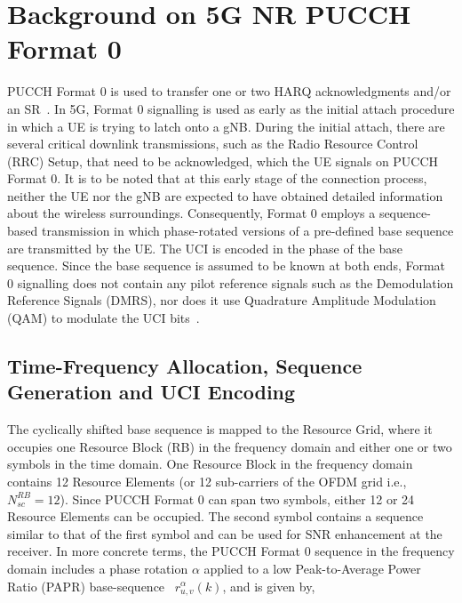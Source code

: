 \documentclass[journal]{IEEEtran}
\begin{document}
\section{Background on 5G NR PUCCH Format 0}
PUCCH Format 0 is used to transfer one or two HARQ acknowledgments and/or an SR~\cite{3gpp_38_213}. In 5G, Format 0 signalling is used as early as the initial attach procedure in which a UE is trying to latch onto a gNB. During the initial attach, there are several critical downlink transmissions, such as the Radio Resource Control (RRC) Setup, that need to be acknowledged, which the UE signals on PUCCH Format 0. It is to be noted that at this early stage of the connection process, neither the UE nor the gNB are expected to have obtained detailed information about the wireless surroundings. Consequently, Format 0 employs a sequence-based transmission in which phase-rotated versions of a pre-defined base sequence are transmitted by the UE. The UCI is encoded in the phase of the base sequence. Since the base sequence is assumed to be known at both ends, Format 0 signalling does not contain any pilot reference signals such as the Demodulation Reference Signals (DMRS), nor does it use Quadrature Amplitude Modulation (QAM) to modulate the UCI bits~\cite{kundu2018physical}.  

\subsection{Time-Frequency Allocation, Sequence Generation and UCI Encoding}
The cyclically shifted base sequence is mapped to the Resource Grid, where it occupies one Resource Block (RB) in the frequency domain and either one or two symbols in the time domain. One Resource Block in the frequency domain contains 12 Resource Elements (or 12 sub-carriers of the OFDM grid i.e., $N_{sc}^{RB}=12$). Since PUCCH Format 0 can span two symbols, either 12 or 24 Resource Elements can be occupied. The second symbol contains a sequence similar to that of the first symbol and can be used for SNR enhancement at the receiver. In more concrete terms, the PUCCH Format 0 sequence in the frequency domain includes a phase rotation $\alpha$ applied to a low Peak-to-Average Power Ratio (PAPR) base-sequence~\cite{3gpp_38_211} $r_{u,v}^{\alpha}(k)$, and is given by, 
\end{document}
